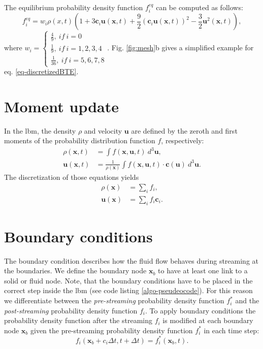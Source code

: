 \documentclass[a4paper,11pt, footsepline]{book}
\begin{document}
The equilibrium probability density function $f_{i}^{eq}$ can be computed as follows:
\begin{equation}
\label{eq-equilibrium}
f_{i}^{eq}=w_{i}\rho(x,t)(1+3\mathbf{c}_{i}\mathbf{u}(\mathbf{x},t)+\frac{9}{2}(\mathbf{c}_{i}\mathbf{u}(\mathbf{x},t))^{2}-\frac{3}{2}\mathbf{u}^{2}(\mathbf{x},t)),
\end{equation}
where $w_{i}=
\begin{cases}
\frac{4}{9}, ~if~i=0\\
\frac{1}{9}, ~if~i=1,2,3,4\\
\frac{1}{36}, ~if~i=5,6,7,8
\end{cases}$. Fig. \ref{fig:mesh}b gives a simplified example for eq. \ref{eq-discretizedBTE}.
\section{Moment update}\label{sec-momentUpdate}
In the \ac{lbm}, the density $\rho$ and velocity $\mathbf{u}$ are defined by the zeroth and first moments of the probability distribution function $f$, respectively:
\begin{align} 
\rho(\mathbf{x},t) &=  \int f(\mathbf{x}, \mathbf{u},t)~d^{3}\mathbf{u}, \\ 
\mathbf{u}(\mathbf{x},t) &=  \frac{1}{\rho(\mathbf{x})}\int f(\mathbf{x}, \mathbf{u},t)\cdot\mathbf{c}(\mathbf{u})~d^{3}\mathbf{u}.
\end{align}
The discretization of those equations yields
\begin{align}
\label{eq-density}
\rho(\mathbf{x}) &=  \sum\limits_{i} f_{i}, \\ 
\label{eq-velocity}
\mathbf{u}(\mathbf{x}) &=  \sum\limits_{i} f_{i}\mathbf{c}_{i}.
\end{align}
\section{Boundary conditions}\label{sec-boundaryConditions}
The boundary condition describes how the fluid flow behaves during streaming at the boundaries. We define the boundary node $\mathbf{x}_{b}$ to have at least one link to a solid or fluid node. 
Note, that the boundary conditions have to be placed in the correct step inside the \ac{lbm} (see code listing \ref{algo-pseudeocode}). For this reason we differentiate between the \textit{pre-streaming} probability density function $f_{i}^{\ast}$ and the \textit{post-streaming} probability density function $f_{i}$.
To apply boundary conditions the probability density function after the streaming $f_i$ is modified at each boundary node $\mathbf{x}_{b}$ given the pre-streaming probability density function $f_{i}^{\ast}$ in each time step:
\begin{equation}
f_i(\mathbf{x}_{b}+c_{i}\Delta t, t+\Delta t)=f_{i}^{\ast}(\mathbf{x}_b,t).
\end{equation}
\end{document}
